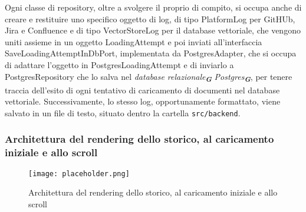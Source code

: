 Ogni classe di repository, oltre a svolgere il proprio di compito, si occupa anche di creare e restituire uno specifico oggetto di log, di tipo PlatformLog per GitHUb, Jira e Confluence e di tipo VectorStoreLog per il database vettoriale, che vengono uniti assieme in un oggetto LoadingAttempt e poi inviati all'interfaccia SaveLoadingAttemptInDbPort, implementata da PostgresAdapter, che si occupa di adattare l'oggetto in PostgresLoadingAttempt e di inviarlo a PostgresRepository che lo salva nel \emph{database relazionale}\textsubscript{\textbf{\textit{G}}} \emph{Postgres}\textsubscript{\textbf{\textit{G}}}, per tenere traccia dell'esito di ogni tentativo di caricamento di documenti nel database vettoriale. Successivamente, lo stesso log, opportunamente formattato, viene salvato in un file di testo, situato dentro la cartella \texttt{src/backend}.

\newpage


\subsubsection{Architettura del rendering dello storico, al caricamento iniziale e allo scroll}
\label{sec:architettura_rendering_storico}

\begin{figure}[h]
    \centering
    \texttt{[image: placeholder.png]}
    \caption{Architettura del rendering dello storico, al caricamento iniziale e allo scroll}
\end{figure}

